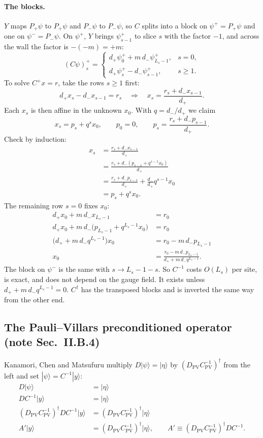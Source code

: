 \documentclass[11pt,a4paper]{article}
\numberwithin{equation}{section}
\newcommand{\dg}{^{\dagger}}
\newcommand{\Dpv}{D_{\mathrm{PV}}}
\newcommand{\Cpv}{C_{\mathrm{PV}}}
\newcommand{\Pp}{P_{+}}
\newcommand{\Pm}{P_{-}}
\begin{document}
\paragraph{The blocks.} $Y$ maps $\Pp\psi$ to $\Pp\psi$ and $\Pm\psi$ to $\Pm\psi$, so $C$ splits into a block on
$\psi^+=\Pp\psi$ and one on $\psi^-=\Pm\psi$. On $\psi^+$, $Y$ brings $\psi^+_{s-1}$ to slice $s$
with the factor $-1$, and across the wall the factor is $-(-m)=+m$:
\begin{equation}
(C\psi)^+_s=\begin{cases}
d_+\psi^+_0+m\,d_-\psi^+_{L_s-1}, & s=0,\\[2pt]
d_+\psi^+_s-d_-\psi^+_{s-1}, & s\ge1 .
\end{cases}
\end{equation}
To solve $C^+x=r$, take the rows $s\ge1$ first:
\begin{equation}
d_+x_s-d_-x_{s-1}=r_s\quad\Longrightarrow\quad x_s=\frac{r_s+d_-x_{s-1}}{d_+}.
\end{equation}
Each $x_s$ is then affine in the unknown $x_0$. With $q=d_-/d_+$ we claim
\begin{equation}
x_s=p_s+q^sx_0,\qquad p_0=0,\qquad p_s=\frac{r_s+d_-p_{s-1}}{d_+}.
\end{equation}
Check by induction:
\begin{align}
x_s&=\frac{r_s+d_-x_{s-1}}{d_+}\nonumber\\
&=\frac{r_s+d_-(p_{s-1}+q^{s-1}x_0)}{d_+}\nonumber\\
&=\frac{r_s+d_-p_{s-1}}{d_+}+\frac{d_-}{d_+}q^{s-1}x_0\nonumber\\
&=p_s+q^sx_0 .
\end{align}
The remaining row $s=0$ fixes $x_0$:
\begin{align}
d_+x_0+m\,d_-x_{L_s-1}&=r_0\nonumber\\
d_+x_0+m\,d_-\big(p_{L_s-1}+q^{L_s-1}x_0\big)&=r_0\nonumber\\
\big(d_++m\,d_-q^{L_s-1}\big)x_0&=r_0-m\,d_-p_{L_s-1}\nonumber\\
x_0&=\frac{r_0-m\,d_-p_{L_s-1}}{d_++m\,d_-q^{L_s-1}} .
\end{align}
The block on $\psi^-$ is the same with $s\to L_s-1-s$. So $C^{-1}$ costs $O(L_s)$ per site, is
exact, and does not depend on the gauge field. It exists unless $d_++m\,d_-q^{L_s-1}=0$. $C\dg$
has the transposed blocks and is inverted the same way from the other end.


\subsection{The Pauli--Villars preconditioned operator (note Sec.~II.B.4)}
\label{sec:Aprime}
Kanamori, Chen and Matsufuru multiply $D|\psi\rangle=|\eta\rangle$ by $(\Dpv\Cpv^{-1})\dg$ from the
left and set $|\psi\rangle=C^{-1}|y\rangle$:
\begin{align}
D|\psi\rangle&=|\eta\rangle\nonumber\\
DC^{-1}|y\rangle&=|\eta\rangle\nonumber\\
(\Dpv\Cpv^{-1})\dg DC^{-1}|y\rangle&=(\Dpv\Cpv^{-1})\dg|\eta\rangle\nonumber\\
A'|y\rangle&=(\Dpv\Cpv^{-1})\dg|\eta\rangle,\qquad A'\equiv(\Dpv\Cpv^{-1})\dg DC^{-1}.
\end{align}
\end{document}
